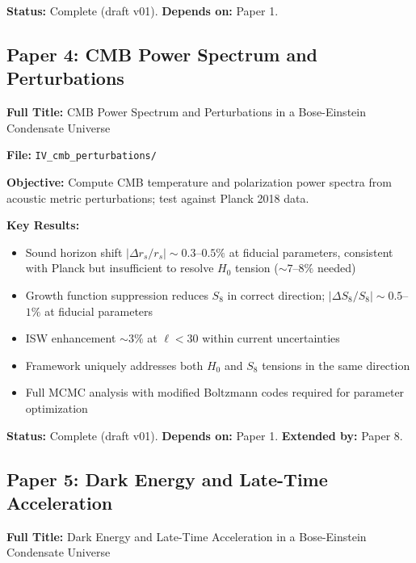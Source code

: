\documentclass[11pt,a4paper]{article}
\begin{document}
\textbf{Status:} Complete (draft v01). \quad \textbf{Depends on:} Paper 1.

\subsection{Paper 4: CMB Power Spectrum and Perturbations}
\label{sec:paper4}

\textbf{Full Title:} CMB Power Spectrum and Perturbations in a Bose-Einstein Condensate Universe

\textbf{File:} \texttt{IV\_cmb\_perturbations/}

\textbf{Objective:} Compute CMB temperature and polarization power spectra from acoustic metric perturbations; test against Planck 2018 data.

\textbf{Key Results:}
\begin{itemize}[leftmargin=*, itemsep=0.1em]
\item Sound horizon shift $|\Delta r_s/r_s| \sim 0.3$--$0.5\%$ at fiducial parameters, consistent with Planck but insufficient to resolve $H_0$ tension ($\sim 7$--$8\%$ needed)
\item Growth function suppression reduces $S_8$ in correct direction; $|\Delta S_8/S_8| \sim 0.5$--$1\%$ at fiducial parameters
\item ISW enhancement $\sim 3\%$ at $\ell < 30$ within current uncertainties
\item Framework uniquely addresses both $H_0$ and $S_8$ tensions in the same direction
\item Full MCMC analysis with modified Boltzmann codes required for parameter optimization
\end{itemize}

\textbf{Status:} Complete (draft v01). \quad \textbf{Depends on:} Paper 1. \quad \textbf{Extended by:} Paper 8.

\subsection{Paper 5: Dark Energy and Late-Time Acceleration}
\label{sec:paper5}

\textbf{Full Title:} Dark Energy and Late-Time Acceleration in a Bose-Einstein Condensate Universe
\end{document}
